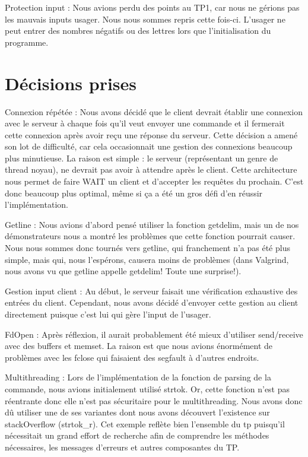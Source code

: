 \documentclass[11pt]{article}
\begin{document}
Protection input : Nous avions perdu des points au TP1, car nous ne gérions pas les mauvais inputs usager. Nous nous sommes repris cette fois-ci. L’usager ne peut entrer des nombres négatifs ou des lettres lors que l’initialisation du programme. 
\section{Décisions prises}
Connexion répétée : Nous avons décidé que le client devrait établir une connexion avec le serveur à chaque fois qu'il veut envoyer une commande et il fermerait cette connexion après avoir reçu une réponse du serveur. Cette décision a amené son lot de difficulté, car cela occasionnait une gestion des connexions beaucoup plus minutieuse. La raison est simple : le serveur (représentant un genre de thread noyau), ne devrait pas avoir à attendre après le client. Cette architecture nous permet de faire WAIT un client et d’accepter les requêtes du prochain. C’est donc beaucoup plus optimal, même si ça a été un gros défi d’en réussir l’implémentation. 

Getline : Nous avions d’abord pensé utiliser la fonction getdelim, mais un de nos démonstrateurs nous a  montré les problèmes que cette fonction pourrait causer. Nous nous sommes donc tournés vers getline, qui franchement n’a pas été plus simple, mais qui, nous l’espérons, causera moins de problèmes (dans Valgrind, nous avons vu que getline appelle getdelim! Toute une surprise!).

Gestion input client : Au début, le serveur faisait une vérification exhaustive des entrées du client. Cependant, nous avons décidé d’envoyer cette gestion au client directement puisque c’est lui qui gère l’input de l’usager.

FdOpen : Après réflexion, il aurait probablement été mieux d’utiliser send/receive avec des buffers et memset. La raison est que nous avions énormément de problèmes avec les fclose qui faisaient des segfault à d’autres endroits.

Multithreading : Lors de l’implémentation de la fonction de parsing de la commande, nous avions initialement utilisé strtok. Or, cette fonction n'est pas réentrante donc elle n'est pas sécuritaire pour le multithreading. Nous avons donc dû utiliser une de ses variantes dont nous avons découvert l'existence sur stackOverflow (strtok\_r). Cet exemple reflète bien l'ensemble du tp puisqu'il nécessitait un grand effort de recherche afin de comprendre les méthodes nécessaires, les messages d'erreurs et autres composantes du TP.
\end{document}

